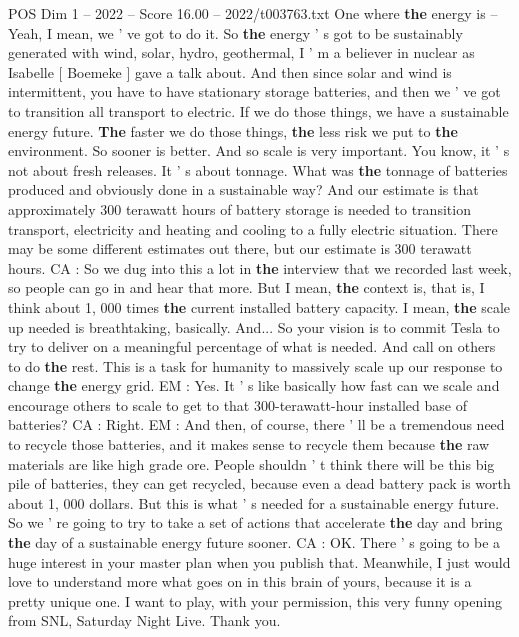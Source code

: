 \begin{textsample}{POS Dim 1 – 2022 – Score 16.00 – 2022/t003763.txt}
One where \textbf{the} energy is -- Yeah, I mean, we ' ve got to do it.
So \textbf{the} energy ' s got to be sustainably generated with wind, solar, hydro, geothermal, I ' m a believer in nuclear as Isabelle [ Boemeke ] gave a talk about.
And then since solar and wind is intermittent, you have to have stationary storage batteries, and then we ' ve got to transition all transport to electric.
If we do those things, we have a sustainable energy future. \textbf{The} faster we do those things, \textbf{the} less risk we put to \textbf{the} environment.
So sooner is better.
And so scale is very important.
You know, it ' s not about fresh releases.
It ' s about tonnage.
What was \textbf{the} tonnage of batteries produced and obviously done in a sustainable way?
And our estimate is that approximately 300 terawatt hours of battery storage is needed to transition transport, electricity and heating and cooling to a fully electric situation.
There may be some different estimates out there, but our estimate is 300 terawatt hours.
CA : So we dug into this a lot in \textbf{the} interview that we recorded last week, so people can go in and hear that more.
But I mean, \textbf{the} context is, that is, I think about 1, 000 times \textbf{the} current installed battery capacity.
I mean, \textbf{the} scale up needed is breathtaking, basically.
And...
So your vision is to commit Tesla to try to deliver on a meaningful percentage of what is needed.
And call on others to do \textbf{the} rest.
This is a task for humanity to massively scale up our response to change \textbf{the} energy grid.
EM : Yes.
It ' s like basically how fast can we scale and encourage others to scale to get to that 300-terawatt-hour installed base of batteries?
CA : Right.
EM : And then, of course, there ' ll be a tremendous need to recycle those batteries, and it makes sense to recycle them because \textbf{the} raw materials are like high grade ore.
People shouldn ' t think there will be this big pile of batteries, they can get recycled, because even a dead battery pack is worth about 1, 000 dollars.
But this is what ' s needed for a sustainable energy future.
So we ' re going to try to take a set of actions that accelerate \textbf{the} day and bring \textbf{the} day of a sustainable energy future sooner.
CA : OK.
There ' s going to be a huge interest in your master plan when you publish that.
Meanwhile, I just would love to understand more what goes on in this brain of yours, because it is a pretty unique one.
I want to play, with your permission, this very funny opening from SNL, Saturday Night Live.
Thank you.

\end{textsample}
